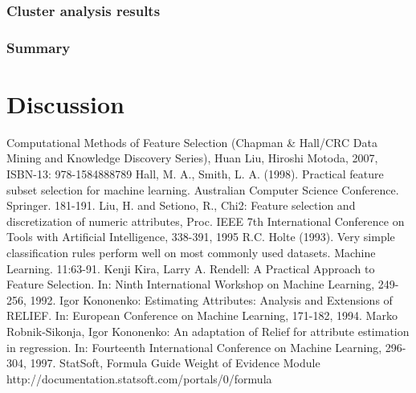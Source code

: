 \documentclass[10pt]{article}\usepackage[]{graphicx}\usepackage[]{color}
\begin{document}
\clearpage
\section{Cluster analysis results}


\clearpage
\section{Summary}



\clearpage
\part{Discussion}






\clearpage
\begin{thebibliography}{99}
\bibitem{} Computational Methods of Feature Selection (Chapman \& Hall/CRC Data Mining and Knowledge Discovery Series), Huan Liu, Hiroshi Motoda, 2007, ISBN-13: 978-1584888789  
\bibitem{} Hall, M. A., Smith, L. A. (1998). Practical feature subset selection for machine learning. Australian Computer Science Conference. Springer. 181-191.
\bibitem{} Liu, H. and Setiono, R., Chi2: Feature selection and discretization of numeric attributes, Proc. IEEE 7th International Conference on Tools with Artificial Intelligence, 338-391, 1995
\bibitem{} R.C. Holte (1993). Very simple classification rules perform well on most commonly used datasets. Machine Learning. 11:63-91.
\bibitem{} Kenji Kira, Larry A. Rendell: A Practical Approach to Feature Selection. In: Ninth International Workshop on Machine Learning, 249-256, 1992.
\bibitem{} Igor Kononenko: Estimating Attributes: Analysis and Extensions of RELIEF. In: European Conference on Machine Learning, 171-182, 1994.
\bibitem{} Marko Robnik-Sikonja, Igor Kononenko: An adaptation of Relief for attribute estimation in regression. In: Fourteenth International Conference on Machine Learning, 296-304, 1997.
\bibitem{} StatSoft, Formula Guide Weight of Evidence Module http://documentation.statsoft.com/portals/0/formula%
\end{thebibliography}
\end{document}
